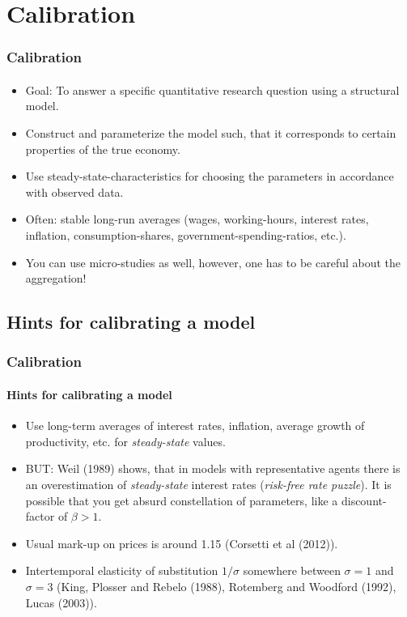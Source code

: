 \documentclass{beamer} %
\begin{document}
\section{Calibration}
\begin{frame}\frametitle{Calibration}\framesubtitle{}
\begin{itemize}
   \item Goal: To answer a specific quantitative research question using
       a structural model.
   \item Construct and parameterize the model such, that it corresponds
       to certain properties of the true economy.
   \item Use steady-state-characteristics for choosing the parameters in
       accordance with observed data.
   \item Often: stable long-run averages (wages, working-hours, interest
       rates, inflation, consumption-shares, government-spending-ratios,
       etc.).
   \item You can use micro-studies as well, however, one has to be
       careful about the aggregation!
\end{itemize}
\end{frame}

\subsection{Hints for calibrating a model}
\begin{frame}\frametitle{Calibration}\framesubtitle{Hints for calibrating a model}

\begin{itemize}
   \item Use long-term averages of interest rates, inflation, average
       growth of productivity, etc. for \emph{steady-state} values.
   \item BUT: Weil (1989) shows, that in models with representative
       agents there is an overestimation of \emph{steady-state} interest
       rates (\emph{risk-free rate puzzle}). It is possible that you get
       absurd constellation of parameters, like a discount-factor of
       $\beta>1$.
   \item Usual mark-up on prices is around 1.15 (Corsetti et al (2012)).
   \item Intertemporal elasticity of substitution  $1/\sigma$ somewhere
       between $\sigma=1$ and $\sigma=3$ (King, Plosser and Rebelo
       (1988), Rotemberg and Woodford (1992), Lucas (2003)).
\end{itemize}
\end{frame}
\end{document}
